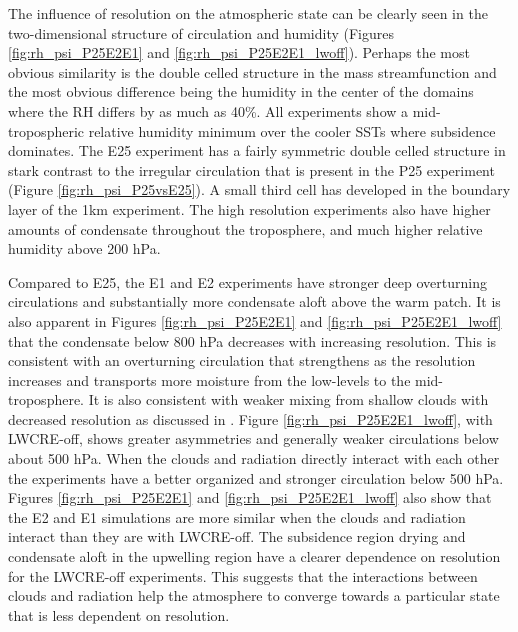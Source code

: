 \documentclass[draft]{agujournal2019}
\begin{document}
{The influence of resolution on the atmospheric state can be clearly seen in the two-dimensional structure 
of circulation and humidity (Figures \ref{fig:rh_psi_P25E2E1} and \ref{fig:rh_psi_P25E2E1_lwoff}).
Perhaps the most obvious similarity is the double celled structure in the mass streamfunction and the most 
obvious difference being the humidity in the center of the domains where the RH differs by as much as 40\%. 
All experiments show a mid-tropospheric relative humidity minimum over the cooler SSTs where subsidence 
dominates.  The E25 experiment has a fairly symmetric double celled structure in stark contrast to the irregular circulation 
that is present in the P25 experiment (Figure \ref{fig:rh_psi_P25vsE25}). 
A small third cell has developed in the boundary layer of the 1km experiment.   The high resolution experiments also have 
higher amounts of condensate throughout the troposphere, and much higher relative humidity 
above 200 hPa. 
 
Compared to E25, the E1 and E2 experiments have stronger deep overturning circulations and substantially 
more condensate aloft above the warm patch.    It is also apparent in Figures 
\ref{fig:rh_psi_P25E2E1} and \ref{fig:rh_psi_P25E2E1_lwoff} that the condensate below 800 hPa 
decreases with increasing resolution.  
This is consistent with an overturning circulation that 
strengthens as the resolution increases and transports more moisture from the low-levels to the 
mid-troposphere.  It is also consistent with weaker mixing from shallow clouds with decreased resolution as
discussed in .   Figure \ref{fig:rh_psi_P25E2E1_lwoff}, with LWCRE-off, shows greater asymmetries 
and generally weaker circulations below about 500 hPa.  
When the clouds and radiation directly interact with each other the experiments have a better
organized and stronger circulation below 500 hPa.  Figures \ref{fig:rh_psi_P25E2E1} and 
\ref{fig:rh_psi_P25E2E1_lwoff} also show that the E2 and E1 simulations are more 
similar when the clouds and radiation interact than they are with LWCRE-off.  The subsidence 
region drying and condensate aloft in the upwelling region have a clearer dependence on resolution for the
LWCRE-off experiments.  This suggests that the interactions between clouds and radiation help the 
atmosphere to converge towards a particular state that is less dependent on resolution.  
  
}
\end{document}
